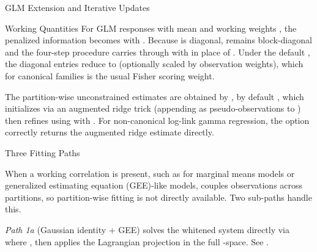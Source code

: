 \begin{Section}{GLM Extension and Iterative Updates}


%
\begin{SubSection}{Working Quantities}
For GLM responses with mean  and working
weights , the penalized
information becomes
 with
.
Because  is diagonal,
 remains block-diagonal and
the four-step procedure carries through with
 in place of
.
Under the default , the diagonal entries reduce
to  (optionally scaled by observation weights),
which for canonical families is the usual Fisher scoring weight.

The partition-wise unconstrained estimates are obtained by
, by default
, which initializes via an augmented
ridge trick (appending  as
pseudo-observations to ) then refines using
 with . For
non-canonical log-link gamma regression, the 
option correctly returns the augmented ridge estimate directly.
\end{SubSection}


%
\begin{SubSection}{Three Fitting Paths}

When a working correlation  is present, such as for
marginal means models or generalized estimating equation (GEE)-like models,
 couples observations across partitions, so
partition-wise fitting is not directly available. Two sub-paths handle
this.

\emph{Path 1a} (Gaussian identity + GEE) solves the whitened system
directly via
 where
, then applies
the Lagrangian projection in the full -space.
See .


\end{SubSection}
\end{Section}
